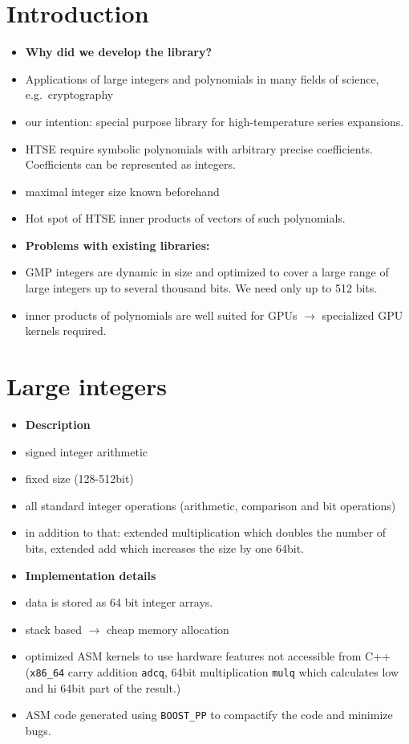 \documentclass[oribibl]{llncs2e/llncs}
\begin{document}
\section{Introduction}
\begin{itemize}
\item {\bf Why did we develop the library?}
\item Applications of large integers and polynomials in many fields of science, e.g.\ cryptography
\item our intention: special purpose library for high-temperature series expansions.
\item HTSE require symbolic polynomials with arbitrary precise coefficients. Coefficients can be represented as integers.
\item maximal integer size known beforehand
\item Hot spot of HTSE inner products of vectors of such polynomials.
\item {\bf Problems with existing libraries:}
\item GMP integers are dynamic in size and optimized to cover a large range of large integers up to several thousand bits. We need only up to 512 bits.
\item inner products of polynomials are well suited for GPUs $\rightarrow$ specialized GPU kernels required.
\end{itemize}



\section{Large integers}
\begin{itemize}
\item {\bf Description}
\item signed integer arithmetic
\item fixed size (128-512bit)
\item all standard integer operations (arithmetic, comparison and bit operations)
\item in addition to that: extended multiplication which doubles the number of bits, extended add which increases the size by one 64bit.
\item {\bf Implementation details}
\item data is stored as 64 bit integer arrays.
\item stack based $\rightarrow$ cheap memory allocation
\item optimized ASM kernels to use hardware features not accessible from C++ (\verb|x86_64| carry addition \verb|adcq|, 64bit multiplication \verb|mulq| which calculates low and hi 64bit part of the result.)
\item ASM code generated using \verb|BOOST_PP| to compactify the code and minimize bugs.
\end{itemize}
\end{document}
